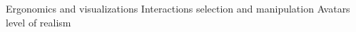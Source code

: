  



Ergonomics and visualizations
Interactions selection and manipulation
Avatars level of realism







\subparagraph[Future work]{}

